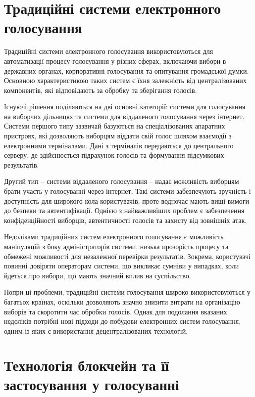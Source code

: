 \documentclass[14pt]{extreport}
\begin{document}
  \section{Традиційні системи електронного голосування}
  
  Традиційні системи електронного голосування використовуються для автоматизації процесу голосування у різних сферах, включаючи вибори в державних органах, корпоративні голосування та опитування громадської думки. Основною характеристикою таких систем є їхня залежність від централізованих компонентів, які відповідають за обробку та зберігання голосів.

  Існуючі рішення поділяються на дві основні категорії: системи для голосування на виборчих дільницях та системи для віддаленого голосування через інтернет. Системи першого типу зазвичай базуються на спеціалізованих апаратних пристроях, які дозволяють виборцям віддати свій голос шляхом взаємодії з електронними терміналами. Дані з терміналів передаються до центрального серверу, де здійснюється підрахунок голосів та формування підсумкових результатів.

  Другий тип – системи віддаленого голосування – надає можливість виборцям брати участь у голосуванні через інтернет. Такі системи забезпечують зручність і доступність для широкого кола користувачів, проте водночас мають вищі вимоги до безпеки та автентифікації. Однією з найважливіших проблем є забезпечення конфіденційності виборців, автентичності голосів та захисту від зовнішніх атак.

  Недоліками традиційних систем електронного голосування є можливість маніпуляцій з боку адміністраторів системи, низька прозорість процесу та обмежені можливості для незалежної перевірки результатів. Зокрема, користувачі повинні довіряти операторам системи, що викликає сумніви у випадках, коли йдеться про вибори, що мають значний вплив на суспільство.

  Попри ці проблеми, традиційні системи голосування широко використовуються у багатьох країнах, оскільки дозволяють значно знизити витрати на організацію виборів та скоротити час обробки голосів. Однак для подолання вказаних недоліків потрібні нові підходи до побудови електронних систем голосування, одним із яких є використання децентралізованих технологій.
  
  \section{Технологія блокчейн та її застосування у голосуванні}
  
\end{document}
